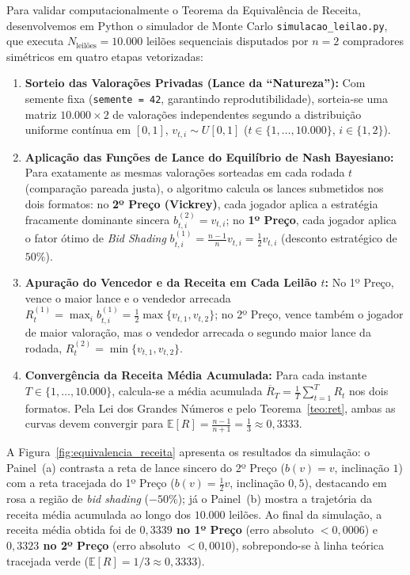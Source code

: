 Para validar computacionalmente o Teorema da Equivalência de Receita, desenvolvemos em Python o simulador de Monte Carlo \texttt{simulacao\_leilao.py}, que executa $N_{\text{leilões}} = 10.000$ leilões sequenciais disputados por $n = 2$ compradores simétricos em quatro etapas vetorizadas:
\begin{enumerate}[label=\arabic*.]
    \item \textbf{Sorteio das Valorações Privadas (Lance da ``Natureza''):} Com semente fixa (\texttt{semente = 42}, garantindo reprodutibilidade), sorteia-se uma matriz $10.000 \times 2$ de valorações independentes segundo a distribuição uniforme contínua em $[0, 1]$, $v_{t,i} \sim U[0, 1]$ ($t \in \{1, \dots, 10.000\}$, $i \in \{1, 2\}$).
    \item \textbf{Aplicação das Funções de Lance do Equilíbrio de Nash Bayesiano:} Para exatamente as mesmas valorações sorteadas em cada rodada $t$ (comparação pareada justa), o algoritmo calcula os lances submetidos nos dois formatos: no \textbf{2º Preço (Vickrey)}, cada jogador aplica a estratégia fracamente dominante sincera $b_{t,i}^{(2)} = v_{t,i}$; no \textbf{1º Preço}, cada jogador aplica o fator ótimo de \textit{Bid Shading} $b_{t,i}^{(1)} = \frac{n-1}{n}v_{t,i} = \frac{1}{2}v_{t,i}$ (desconto estratégico de $50\%$).
    \item \textbf{Apuração do Vencedor e da Receita em Cada Leilão $t$:} No 1º Preço, vence o maior lance e o vendedor arrecada $R_t^{(1)} = \max_{i} b_{t,i}^{(1)} = \frac{1}{2}\max\{v_{t,1}, v_{t,2}\}$; no 2º Preço, vence também o jogador de maior valoração, mas o vendedor arrecada o segundo maior lance da rodada, $R_t^{(2)} = \min\{v_{t,1}, v_{t,2}\}$.
    \item \textbf{Convergência da Receita Média Acumulada:} Para cada instante $T \in \{1, \dots, 10.000\}$, calcula-se a média acumulada $\overline{R}_T = \frac{1}{T}\sum_{t=1}^T R_t$ nos dois formatos. Pela Lei dos Grandes Números e pelo Teorema~\ref{teo:ret}, ambas as curvas devem convergir para $\mathbb{E}[R] = \frac{n-1}{n+1} = \frac{1}{3} \approx 0{,}3333$.
\end{enumerate}

A Figura~\ref{fig:equivalencia_receita} apresenta os resultados da simulação: o Painel~(a) contrasta a reta de lance sincero do 2º Preço ($b(v)=v$, inclinação $1$) com a reta tracejada do 1º Preço ($b(v)=\frac{1}{2}v$, inclinação $0{,}5$), destacando em rosa a região de \textit{bid shading} ($-50\%$); já o Painel~(b) mostra a trajetória da receita média acumulada ao longo dos $10.000$ leilões. Ao final da simulação, a receita média obtida foi de \textbf{$0{,}3339$ no 1º Preço} (erro absoluto $< 0{,}0006$) e \textbf{$0{,}3323$ no 2º Preço} (erro absoluto $< 0{,}0010$), sobrepondo-se à linha teórica tracejada verde ($\mathbb{E}[R] = 1/3 \approx 0{,}3333$).

